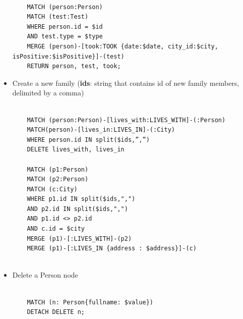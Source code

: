 \documentclass{article}[IEEEtran]
\begin{document}
\begin{itemize}
    \begin{lstlisting}
    
    MATCH (person:Person) 
    MATCH (test:Test) 
    WHERE person.id = $id 
    AND test.type = $type 
    MERGE (person)-[took:TOOK {date:$date, city_id:$city, isPositive:$isPositive}]-(test)
    RETURN person, test, took;

    \end{lstlisting}
    
    \newpage
    
    \item Create a new family (\textbf{ids}: string that contains id of new family members, delimited by a comma)
    
    \begin{lstlisting}
    
    MATCH (person:Person)-[lives_with:LIVES_WITH]-(:Person)
    MATCH(person)-[lives_in:LIVES_IN]-(:City)
    WHERE person.id IN split($ids,”,”)
    DELETE lives_with, lives_in
    
    MATCH (p1:Person)
    MATCH (p2:Person)
    MATCH (c:City)
    WHERE p1.id IN split($ids,",")
    AND p2.id IN split($ids,",")
    AND p1.id <> p2.id 
    AND c.id = $city
    MERGE (p1)-[:LIVES_WITH]-(p2)
    MERGE (p1)-[:LIVES_IN {address : $address}]-(c)


    \end{lstlisting}
    
    \item Delete a Person node
    
    \begin{lstlisting}
    
    MATCH (n: Person{fullname: $value}) 
    DETACH DELETE n;

    \end{lstlisting}
    
    
\end{itemize}


\appendix
\end{document}
